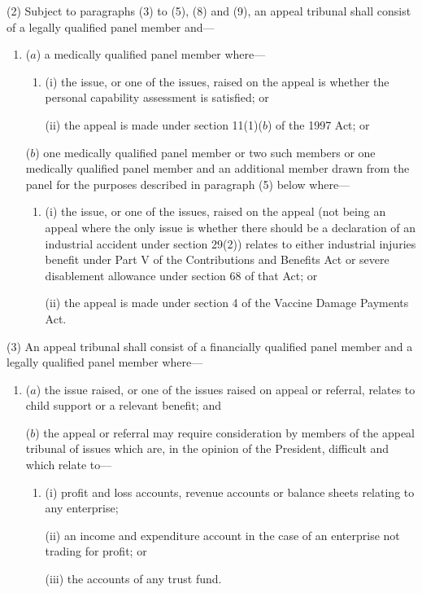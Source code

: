 \documentclass[12pt,a4paper]{article}
\begin{document}
(2) Subject to 
paragraphs (3) to (5), (8) and (9),  %
an appeal tribunal shall consist of a legally qualified panel member and—
\begin{enumerate}\item[]
($a$) a medically qualified panel member where—
\begin{enumerate}\item[]
(i) the issue, or one of the issues, raised on the appeal is whether the 
personal capability assessment  %
is satisfied; or

(ii) the appeal is made under section 11(1)($b$) of the 1997 Act; or
\end{enumerate}

($b$) one medically qualified panel member or two such members or one medically qualified panel member and an additional member drawn from the panel for the purposes described in paragraph (5) below where—
\begin{enumerate}\item[]
(i) the issue, or one of the issues, raised on the appeal 
(not being an appeal where the only issue is whether there should be a declaration of an industrial accident under section 29(2))  %
relates to either industrial injuries benefit under Part V of the Contributions and Benefits Act or severe disablement allowance under section 68 of that Act; or

\enlargethispage{\baselineskip}

(ii) the appeal is made under section 4 of the Vaccine Damage Payments Act.
\end{enumerate}
\end{enumerate}

\pagebreak[3]

(3) An appeal tribunal shall consist of a financially qualified panel member and a legally qualified panel member where—
\begin{enumerate}\item[]
($a$) the issue raised, or one of the issues raised on appeal or referral, relates to child support or a relevant benefit; and

($b$) the appeal or referral may require consideration by members of the appeal tribunal of issues which are, in the opinion of the President, difficult and which relate to—
\begin{enumerate}\item[]
(i) profit and loss accounts, revenue accounts or balance sheets relating to any enterprise;

(ii) an income and expenditure account in the case of an enterprise not trading for profit; or

(iii) the accounts of any trust fund.
\end{enumerate}
\end{enumerate}
\end{document}
